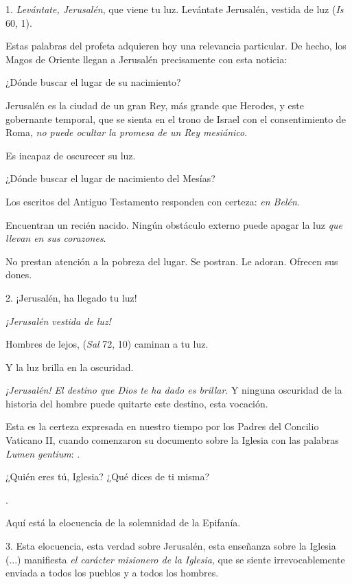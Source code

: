 \begin{body}
	1. \emph{Levántate, Jerusalén}, que viene tu luz. Levántate Jerusalén, vestida de luz (\emph{Is} 60, 1).
	
	Estas palabras del profeta adquieren hoy una relevancia particular. De hecho, los Magos de Oriente llegan a Jerusalén precisamente con esta noticia: 
	
	¿Dónde buscar el lugar de su nacimiento?
	
	Jerusalén es la ciudad de un gran Rey, más grande que Herodes, y este gobernante temporal, que se sienta en el trono de Israel con el consentimiento de Roma, \emph{no puede ocultar la promesa de un Rey mesiánico}.
	
	Es incapaz de oscurecer su luz.
	
	¿Dónde buscar el lugar de nacimiento del Mesías?
	
	Los escritos del Antiguo Testamento responden con certeza: \emph{en Belén}.
	
	Encuentran un recién nacido. Ningún obstáculo externo puede apagar la luz \emph{que llevan en sus corazones}.
	
	No prestan atención a la pobreza del lugar. Se postran. Le adoran. Ofrecen sus dones.
	
	2. ¡Jerusalén, ha llegado tu luz!
	
	\emph{¡Jerusalén vestida de luz!}
	
	Hombres de lejos,  (\emph{Sal} 72, 10) caminan a tu luz.
	
	Y la luz brilla en la oscuridad.
	
	\emph{¡Jerusalén! El destino que Dios te ha dado es brillar}. Y ninguna oscuridad de la historia del hombre puede quitarte este destino, esta vocación.
	
	Esta es la certeza expresada en nuestro tiempo por los Padres del Concilio Vaticano II, cuando comenzaron su documento sobre la Iglesia con las palabras \emph{Lumen gentium}: .
	
	¿Quién eres tú, Iglesia? ¿Qué dices de ti misma?
	
	.
	
	Aquí está la elocuencia de la solemnidad de la Epifanía.
	
	3. Esta elocuencia, esta verdad sobre Jerusalén, esta enseñanza sobre la Iglesia (...) manifiesta \emph{el carácter misionero de la Iglesia}, que se siente irrevocablemente enviada a todos los pueblos y a todos los hombres.
	

\end{body}
